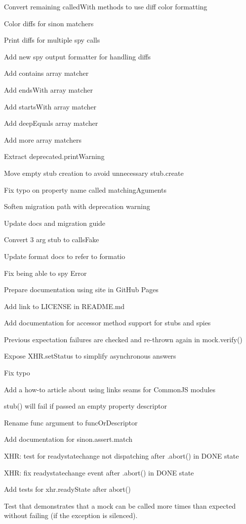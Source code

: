 \begin{DoxyItemize}
\item Convert remaining called\+With methods to use diff color formatting
\item Color diffs for sinon matchers
\item Print diffs for multiple spy calls
\item Add new spy output formatter for handling diffs
\item Add contains array matcher
\item Add ends\+With array matcher
\item Add starts\+With array matcher
\item Add deep\+Equals array matcher
\item Add more array matchers
\item Extract deprecated.\+print\+Warning
\item Move empty stub creation to avoid unnecessary stub.\+create
\item Fix typo on property name called \textquotesingle{}matching\+Aguments\textquotesingle{}
\item Soften migration path with deprecation warning
\item Update docs and migration guide
\item Convert 3 arg stub to calls\+Fake
\item Update format docs to refer to formatio
\item Fix being able to spy Error
\item Prepare documentation using site in Git\+Hub Pages
\item Add link to L\+I\+C\+E\+N\+SE in R\+E\+A\+D\+M\+E.\+md
\item Add documentation for accessor method support for stubs and spies
\item Previous expectation failures are checked and re-\/thrown again in mock.\+verify()
\item Expose X\+H\+R.\+set\+Status to simplify asynchronous answers
\item Fix typo
\item Add a how-\/to article about using links seams for Common\+JS modules
\item stub() will fail if passed an empty property descriptor
\item Rename func argument to func\+Or\+Descriptor
\item Add documentation for sinon.\+assert.\+match
\item X\+HR\+: test for readystatechange not dispatching after .abort() in D\+O\+NE state
\item X\+HR\+: fix readystatechange event after .abort() in D\+O\+NE state
\item Add tests for xhr.\+ready\+State after abort()
\item Test that demonstrates that a mock can be called more times than expected without failing (if the exception is silenced).
\end{DoxyItemize}

